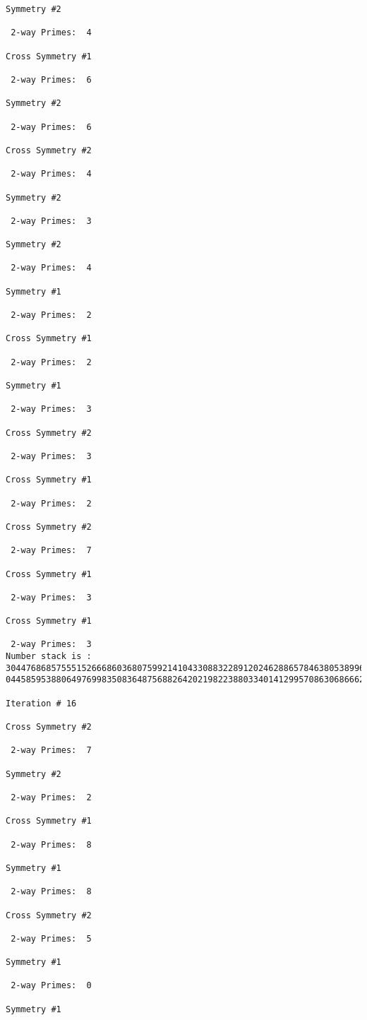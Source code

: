 {{{{\begin{verbatim}
Symmetry #2

 2-way Primes: 	4

Cross Symmetry #1

 2-way Primes: 	6

Symmetry #2

 2-way Primes: 	6

Cross Symmetry #2

 2-way Primes: 	4

Symmetry #2

 2-way Primes: 	3

Symmetry #2

 2-way Primes: 	4

Symmetry #1

 2-way Primes: 	2

Cross Symmetry #1

 2-way Primes: 	2

Symmetry #1

 2-way Primes: 	3

Cross Symmetry #2

 2-way Primes: 	3

Cross Symmetry #1

 2-way Primes: 	2

Cross Symmetry #2

 2-way Primes: 	7

Cross Symmetry #1

 2-way Primes: 	3

Cross Symmetry #1

 2-way Primes: 	3
Number stack is :
30447686857555152666860368075992141043308832289120246288657846380538996794608835958544046240163340857
04458595388064976998350836487568826420219822388033401412995708630686662515557586867440375804336104264

Iteration #	16

Cross Symmetry #2

 2-way Primes: 	7

Symmetry #2

 2-way Primes: 	2

Cross Symmetry #1

 2-way Primes: 	8

Symmetry #1

 2-way Primes: 	8

Cross Symmetry #2

 2-way Primes: 	5

Symmetry #1

 2-way Primes: 	0

Symmetry #1


\end{verbatim}}}}}
